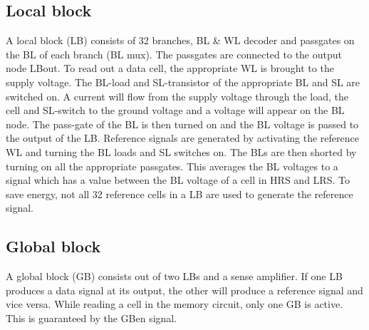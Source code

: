 \documentclass[journal]{IEEEtran}
\begin{document}
\subsection{Local block}
A local block (LB) consists of 32 branches, BL \& WL decoder and passgates on the BL of each branch (BL mux). The passgates are connected to the output node LBout. To read out a data cell, the appropriate WL is brought to the supply voltage. The BL-load and SL-transistor of the appropriate BL and SL are switched on. A current will flow from the supply voltage through the load, the cell and SL-switch to the ground voltage and a voltage will appear on the BL node. The pass-gate of the BL is then turned on and the BL voltage is passed to the output of the LB. Reference signals are generated by activating the reference WL and turning the BL loads and SL switches on. The BLs are then shorted by turning on all the appropriate passgates. This averages the BL voltages to a signal which has a value between the BL voltage of a cell in HRS and LRS. To save energy, not all 32 reference cells in a LB are used to generate the reference signal.

\subsection{Global block} 
A global block (GB) consists out of two LBs and a sense amplifier. If one LB produces a data signal at its output, the other will produce a reference signal and vice versa. While reading a cell in the memory circuit, only one GB is active. This is guaranteed by the GBen signal.
\end{document}
